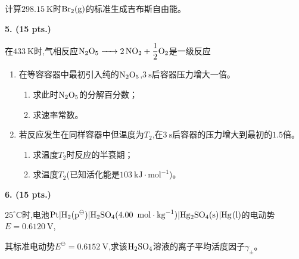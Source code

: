 计算$298.15\ \mathrm{K}$时$\ce{Br_{2}(g)}$的标准生成吉布斯自由能。

\vspace{0.5cm}
\noindent\textbf{5. (15 pts.)}

在$433\ \mathrm{K}$时,气相反应$\ce{N_{2}O_{5} -> 2NO_{2} + \dfrac{1}{2}O_{2}}$是一级反应
\begin{enumerate}[label=(\arabic*), itemsep=1ex]
    \item 在等容容器中最初引入纯的$\ce{N_{2}O_{5}}$,$3\ \mathrm{s}$后容器压力增大一倍。
    \begin{enumerate}[label=\textcircled{\arabic*}, itemsep=1ex]
        \item 求此时$\ce{N_{2}O_{5}}$的分解百分数；
        \item 求速率常数。
    \end{enumerate}
    \item 若反应发生在同样容器中但温度为$T_2$,在$3\ \mathrm{s}$后容器的压力增大到最初的$1.5$倍。
    \begin{enumerate}[label=\textcircled{\arabic*}, itemsep=1ex]
        \item 求温度$T_2$时反应的半衰期；
        \item 求温度$T_2$(已知活化能是$103\ \mathrm{kJ\cdot mol^{-1}}$)。
    \end{enumerate}
\end{enumerate}

\vspace{0.5cm}
\noindent\textbf{6. (15 pts.)}

$25^\circ\mathrm{C}$时,电池$\ce{Pt|H_{2}(p^\ominus)|H_{2}SO_{4}(4.00\ mol\cdot kg^{-1})|Hg_{2}SO_{4}(s)|Hg(l)}$的电动势$E=0.6120\ \mathrm{V}$,

其标准电动势$E^\ominus=0.6152\ \mathrm{V}$,求该$\ce{H_{2}SO_{4}}$溶液的离子平均活度因子$\gamma_\pm$。